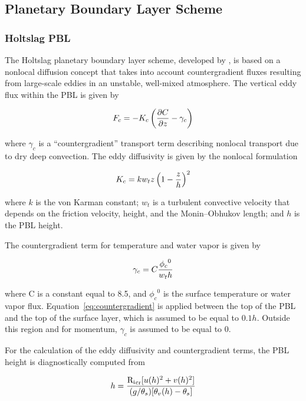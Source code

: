 \subsection{Planetary Boundary Layer Scheme}
\subsubsection{Holtslag PBL}

The Holtslag planetary boundary layer scheme, developed by \cite{Holtslag_90},
is based on a nonlocal diffusion concept that takes into account
countergradient fluxes resulting from large-scale eddies in an unstable,
well-mixed atmosphere.  The vertical eddy flux within the PBL is given by

\begin{eqnarray}
F_c = -K_c \left( {\partial{C} \over \partial{z}} - \gamma_c \right)
\end{eqnarray}

where $\gamma_c$ is a ``countergradient'' transport term describing
nonlocal transport due to dry deep convection.  The eddy diffusivity is given by
the nonlocal formulation

\begin{eqnarray}
K_c = kw_tz \left( 1- {z \over h} \right)^2
\end{eqnarray}

where $k$ is the von Karman constant; $w_t$ is a turbulent convective
velocity that depends on the friction velocity, height, and the Monin--Obhukov
length;  and $h$ is the PBL height.

The countergradient term for temperature and water vapor is given by

\begin{eqnarray}
\label{eq:countergradient}
\gamma_c = C { {\phi_c}^0 \over w_t h}
\end{eqnarray}

where C is a constant equal to 8.5, and ${\phi_c}^0$ is the surface
temperature or water vapor flux. Equation~\ref{eq:countergradient} is applied
between the top of the PBL and the top of the surface layer, which is assumed to
be equal to $0.1h$. Outside this region and for momentum, $\gamma_c$ is assumed
to be equal to 0.  

For the calculation of the eddy diffusivity and countergradient terms, the PBL
height is diagnostically computed from

\begin{eqnarray}
  h = { {\rm {R_i}_{cr}} [u(h)^2 + v(h)^2] \over (g/\theta_s)[\theta_v(h)-\theta_s] }
\end{eqnarray}

